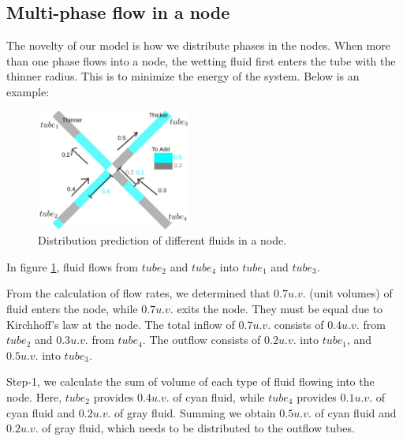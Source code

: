\documentclass{crm-article}
\begin{document}
	\subsection{Multi-phase flow in a node} \label{sec:multi-phase-flow}
		The novelty of our model is how we distribute phases in the nodes. When more than one phase flows into a node, the wetting fluid first enters the tube with the thinner radius. This is to minimize the energy of the system. Below is an example:
		
		\begin{figure}[H]
			\centering
			\includegraphics[width=0.45\textwidth]{fig_distributing_phases_initial}
			\caption{Distribution prediction of different fluids in a node.}
			\label{fig:distributing_phases_initial}
		\end{figure}
		
		In figure \ref{fig:distributing_phases_initial}, fluid flows from ${tube}_2$ and ${tube}_4$ into ${tube}_1$ and ${tube}_3$. 

		From the calculation of flow rates, we determined that $0.7 u.v.$ (unit volumes) of fluid enters the node, while $0.7 u.v.$ exits the node. They must be equal due to Kirchhoff's law at the node. The total inflow of $0.7 u.v.$ consists of $0.4 u.v.$ from ${tube}_2$ and $0.3 u.v.$ from ${tube}_4$. The outflow consists of $0.2 u.v.$ into ${tube}_1$, and $0.5 u.v.$ into ${tube}_3$.
		
		Step-1, we calculate the sum of volume of each type of fluid flowing into the node. Here, ${tube}_2$ provides $0.4 u.v.$ of cyan fluid, while ${tube}_4$ provides $0.1 u.v.$ of cyan fluid and $0.2 u.v.$ of gray fluid. Summing we obtain $0.5 u.v.$ of cyan fluid and $0.2 u.v.$ of gray fluid, which needs to be distributed to the outflow tubes.
		
\end{document}
